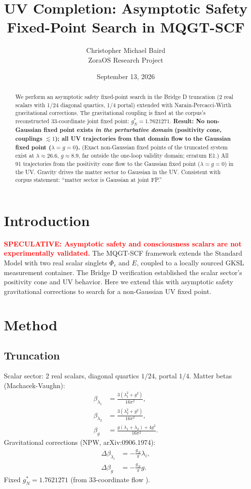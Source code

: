 \documentclass[11pt]{article}
\title{UV Completion: Asymptotic Safety Fixed-Point Search in MQGT-SCF}
\author{Christopher Michael Baird\\ZoraOS Research Project}
\date{September 13, 2026}
\begin{document}
\maketitle

\begin{abstract}
We perform an asymptotic safety fixed-point search in the Bridge D truncation (2 real scalars with 1/24 diagonal quartics, 1/4 portal) extended with Narain-Percacci-Wirth gravitational corrections. The gravitational coupling is fixed at the corpus's reconstructed 33-coordinate joint fixed point: $g_N^* = 1.7621271$. \textbf{Result: No non-Gaussian fixed point exists \emph{in the perturbative domain} (positivity cone, couplings $\lesssim 1$); all UV trajectories from that domain flow to the Gaussian fixed point ($\lambda=g=0$).} (Exact non-Gaussian fixed points of the truncated system exist at $\lambda\approx 26.6$, $g\approx 8.9$, far outside the one-loop validity domain; erratum E1.) All 91 trajectories from the positivity cone flow to the Gaussian fixed point ($\lambda=g=0$) in the UV. Gravity drives the matter sector to Gaussian in the UV. Consistent with corpus statement: ``matter sector is Gaussian at joint FP.''
\end{abstract}

\section{Introduction}
\textbf{\textcolor{red}{SPECULATIVE: Asymptotic safety and consciousness scalars are not experimentally validated.}}
The MQGT-SCF framework \citep{part0} extends the Standard Model with two real scalar singlets $\Phi_c$ and $E$, coupled to a locally sourced GKSL measurement container. The Bridge D verification \citep{bridgeD} established the scalar sector's positivity cone and UV behavior. Here we extend this with asymptotic safety gravitational corrections \citep{NPW} to search for a non-Gaussian UV fixed point.

\section{Method}
\subsection{Truncation}
Scalar sector: 2 real scalars, diagonal quartics $1/24$, portal $1/4$. Matter betas (Machacek-Vaughn):
\begin{align}
\beta_{\lambda_1} &= \frac{3(\lambda_1^2 + g^2)}{16\pi^2}, \\
\beta_{\lambda_2} &= \frac{3(\lambda_2^2 + g^2)}{16\pi^2}, \\
\beta_g &= \frac{g(\lambda_1+\lambda_2) + 4g^2}{16\pi^2}.
\end{align}
Gravitational corrections (NPW, arXiv:0906.1974):
\begin{align}
\Delta\beta_{\lambda_i} &= -\frac{g_N}{\pi}\lambda_i, \\
\Delta\beta_g &= -\frac{g_N}{\pi}g.
\end{align}
Fixed $g_N^* = 1.7621271$ (from 33-coordinate flow \citep{manifest}).
\end{document}
